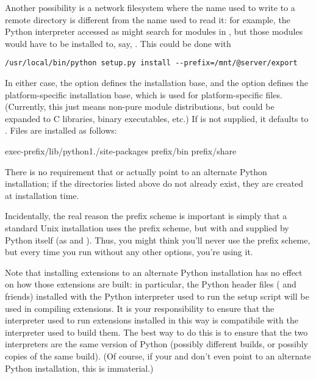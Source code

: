 \documentclass{howto}
\begin{document}
Another possibility is a network filesystem where the name used to write
to a remote directory is different from the name used to read it: for
example, the Python interpreter accessed as 
might search for modules in ,
but those modules would have to be installed to, say,
.  This
could be done with
\begin{verbatim}
/usr/local/bin/python setup.py install --prefix=/mnt/@server/export
\end{verbatim}

In either case, the  option defines the
installation base, and the  option defines
the platform-specific installation base, which is used for
platform-specific files.  (Currently, this just means non-pure module
distributions, but could be expanded to C libraries, binary executables,
etc.)  If  is not supplied, it defaults to
.  Files are installed as follows:

              {exec-prefix}{/lib/python1./site-packages}
              {prefix}{/bin}
              {prefix}{/share}

There is no requirement that  or
 actually point to an alternate Python
installation; if the directories listed above do not already exist, they
are created at installation time.

Incidentally, the real reason the prefix scheme is important is simply
that a standard Unix installation uses the prefix scheme, but with
 and  supplied by
Python itself (as  and ).  Thus,
you might think you'll never use the prefix scheme, but every time you
run  without any other options, you're
using it.

Note that installing extensions to an alternate Python installation has
no effect on how those extensions are built: in particular, the Python
header files ( and friends) installed with the Python
interpreter used to run the setup script will be used in compiling
extensions.  It is your responsibility to ensure that the interpreter
used to run extensions installed in this way is compatibile with the
interpreter used to build them.  The best way to do this is to ensure
that the two interpreters are the same version of Python (possibly
different builds, or possibly copies of the same build).  (Of course, if
your  and  don't even
point to an alternate Python installation, this is immaterial.)
\end{document}
